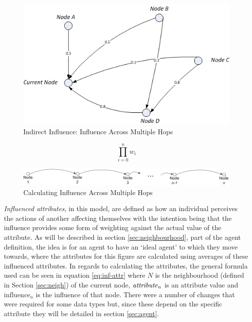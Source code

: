 \documentclass[]{report}
\begin{document}
\begin{figure}
\begin{center}
\includegraphics[scale=0.75]{multi-inf.png}
\end{center}
\caption{Indirect Influence: Influence Across Multiple Hops}
\label{img:multihop-inf}
\end{figure}

\begin{equation}
\prod_{i=0}^{n}w_{i}
\label{eq:multihop-inf}
\end{equation}

\begin{figure}
\begin{center}
\includegraphics[scale=0.75]{multihop-inf.png}
\end{center}
\caption{Calculating Influence Across Multiple Hops}
\label{img:multihop-inf-calc}
\end{figure}
\emph{Influenced attributes}, in this model, are defined as how an individual perceives the actions of another affecting themselves with the intention being that the influence provides some form of weighting against the actual value of the attribute. As will be described in section \ref{sec:neighbourhood}, part of the agent definition, the idea is for an agent to have an `ideal agent' to which they move towards, where the attributes for this figure are calculated using averages of these influenced attributes. In regards to calculating the attributes, the general formula used can be seen in equation \ref{eq:inf-attr} where $N$ is the neighbourhood (defined in Section \ref{sec:neigh}) of the current node, $\text{\emph{attribute}}_{n}$ is an attribute value and $\text{influence}_{n}$ is the influence of that node. There were a number of changes that were required for some data types but, since these depend on the specific attribute they will be detailed in section \ref{sec:agent}.
\end{document}

